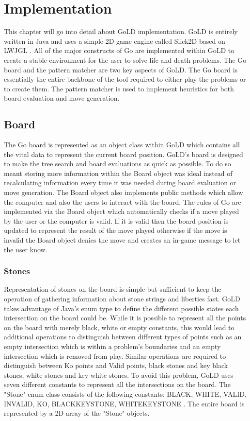\documentclass{l4proj}
\begin{document}
\chapter{Implementation}
This chapter will go into detail about GoLD implementation. GoLD is entirely written in Java and uses a simple 2D game engine called Slick2D \cite{SLICK2D} based on LWJGL \cite{LWJGL}. All of the major constructs of Go are implemented within GoLD to create a stable environment for the user to solve life and death problems.  The Go board and the pattern matcher are two key aspects of GoLD. The Go board is essentially the entire backbone of the tool required to either play the problems or to create them. The pattern matcher is used to implement heuristics for both board evaluation and move generation.

\section{Board}

The Go board is represented as an object class within GoLD which contains all the vital data to represent the current board position. GoLD's board is designed to make the tree search and board evaluations as quick as possible. To do so meant storing more information within the Board object was ideal instead of recalculating information every time it was needed during board evaluation or move generation. The Board object also implements public methods which allow the computer and also the users to interact with the board. The rules of Go are implemented via the Board object which automatically checks if a move played by the user or the computer is valid. If it is valid then the board position is updated to represent the result of the move played otherwise if the move is invalid the Board object denies the move and creates an in-game message to let the user know.

\subsection{Stones}
Representation of stones on the board is simple but sufficient to keep the operation of gathering information about stone strings and liberties fast. GoLD takes advantage of Java’s enum type to define the different possible states each intersection on the board could be. While it is possible to represent all the points on the board with merely black, white or empty constants, this would lead to additional operations to distinguish between different types of points such as an empty intersection which is within a problem’s boundaries and an empty intersection which is removed from play. Similar operations are required to distinguish between Ko points and Valid points, black stones and key black stones, white stones and key white stones. To avoid this problem, GoLD uses seven different constants to represent all the intersections on the board. The "Stone" enum class consists of the following constants: BLACK, WHITE, VALID, INVALID, KO, BLACKKEYSTONE, WHITEKEYSTONE . The entire board is represented by a 2D array of the "Stone" objects.
\end{document}
